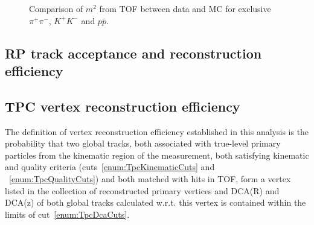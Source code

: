 \begin{figure}[ht!]
{  \begin{subfigure}[b]{\linewidth}{
                }
  \end{subfigure}
}%
\caption{Comparison of $m^{2}$ from TOF between data and MC for exclusive $\pi^{+}\pi^{-}$, $K^{+}K^{-}$ and $p\bar{p}$.}
\end{figure}









\subsection{RP track acceptance and reconstruction efficiency}\label{sec:rpAccAndEff}

\subsection{TPC vertex reconstruction efficiency}\label{sec:tpcVxRecoEff}

The definition of vertex reconstruction efficiency established in this analysis is the probability that two global tracks, both associated with true-level primary particles from the kinematic region of the measurement, both satisfying kinematic and quality criteria (cuts~\ref{enum:TpcKinematicCuts} and ~\ref{enum:TpcQualityCuts}) and both matched with hits in TOF, form a vertex listed in the collection of reconstructed primary vertices and DCA(R) and DCA(z) of both global tracks calculated w.r.t. this vertex is contained within the limits of cut~\ref{enum:TpcDcaCuts}.

